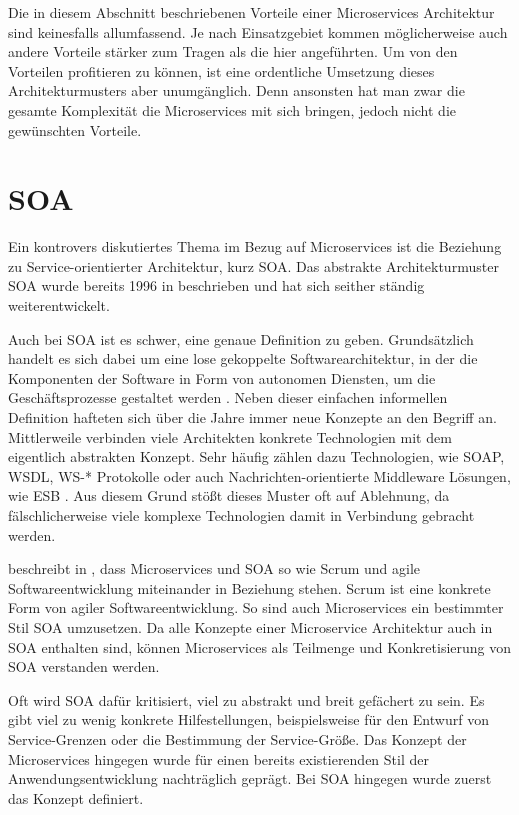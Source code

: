 Die in diesem Abschnitt beschriebenen Vorteile einer Microservices Architektur sind keinesfalls allumfassend. Je nach Einsatzgebiet kommen möglicherweise auch andere Vorteile stärker zum Tragen als die hier angeführten. Um von den Vorteilen profitieren zu können, ist eine ordentliche Umsetzung dieses Architekturmusters aber unumgänglich. Denn ansonsten hat man zwar die gesamte Komplexität die Microservices mit sich bringen, jedoch nicht die gewünschten Vorteile.

\section{SOA}

Ein kontrovers diskutiertes Thema im Bezug auf Microservices ist die Beziehung zu Service-orientierter Architektur, kurz SOA. Das abstrakte Architekturmuster SOA wurde bereits 1996 in \cite{schulte1996service} beschrieben und hat sich seither ständig weiterentwickelt.

Auch bei SOA ist es schwer, eine genaue Definition zu geben. Grundsätzlich handelt es sich dabei um eine lose gekoppelte Softwarearchitektur, in der die Komponenten der Software in Form von autonomen Diensten, um die Geschäftsprozesse gestaltet werden \cite{soaRW}. Neben dieser einfachen informellen Definition hafteten sich über die Jahre immer neue Konzepte an den Begriff an. Mittlerweile verbinden viele Architekten konkrete Technologien mit dem eigentlich abstrakten Konzept. Sehr häufig zählen dazu Technologien, wie SOAP, WSDL, WS-* Protokolle oder auch Nachrichten-orientierte Middleware Lösungen, wie ESB \cite{fowlerGoTo}. Aus diesem Grund stößt dieses Muster oft auf Ablehnung, da fälschlicherweise viele komplexe Technologien damit in Verbindung gebracht werden.

\citeauthor{newman2015building} beschreibt in \cite{newman2015building}, dass Microservices und SOA so wie Scrum und agile Softwareentwicklung miteinander in Beziehung stehen. Scrum ist eine konkrete Form von agiler Softwareentwicklung. So sind auch Microservices ein bestimmter Stil SOA umzusetzen. Da alle Konzepte einer Microservice Architektur auch in SOA enthalten sind, können Microservices als Teilmenge und Konkretisierung von SOA verstanden werden.

Oft wird SOA dafür kritisiert, viel zu abstrakt und breit gefächert zu sein. Es gibt viel zu wenig konkrete Hilfestellungen, beispielsweise für den Entwurf von Service-Grenzen oder die Bestimmung der Service-Größe. Das Konzept der Microservices hingegen wurde für einen bereits existierenden Stil der Anwendungsentwicklung nachträglich geprägt. Bei SOA hingegen wurde zuerst das Konzept definiert.


